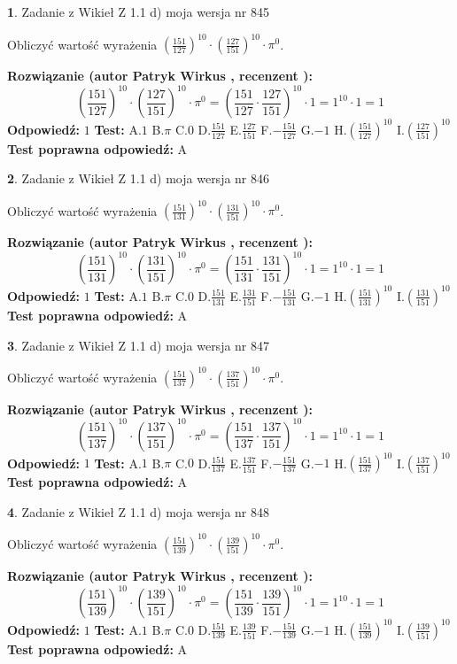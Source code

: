 \documentclass[12pt, a4paper]{article}
\theoremstyle{definition} %
\newtheorem{zad}{}
\newcommand{\zadStart}[1]{\begin{zad}#1\newline}
\newcommand{\zadStop}{\end{zad}}
\newcommand{\rozwStart}[2]{\noindent \textbf{Rozwiązanie (autor #1 , recenzent #2): }\newline}
\newcommand{\rozwStop}{\newline}
\newcommand{\odpStart}{\noindent \textbf{Odpowiedź:}\newline}
\newcommand{\odpStop}{\newline}
\newcommand{\testStart}{\noindent \textbf{Test:}\newline}
\newcommand{\testStop}{\newline}
\newcommand{\kluczStart}{\noindent \textbf{Test poprawna odpowiedź:}\newline}
\newcommand{\kluczStop}{\newline}
\begin{document}
\zadStart{Zadanie z Wikieł Z 1.1 d) moja wersja nr 845}

Obliczyć wartość wyrażenia $(\frac{151}{127})^{10} \cdot (\frac{127}{151})^{10} \cdot \pi^{0}$.
\zadStop
\rozwStart{Patryk Wirkus}{}
$$(\frac{151}{127})^{10} \cdot (\frac{127}{151})^{10} \cdot \pi^{0} = (\frac{151}{127} \cdot \frac{127}{151})^{10} \cdot 1 = 1^{10} \cdot 1 = 1$$
\rozwStop
\odpStart
$1$
\odpStop
\testStart
A.$1$ B.$\pi$ C.$0$ D.$\frac{151}{127}$ E.$\frac{127}{151}$
F.$-\frac{151}{127}$ G.$-1$
H.$(\frac{151}{127})^{10}$
I.$(\frac{127}{151})^{10}$
\testStop
\kluczStart
A
\kluczStop



\zadStart{Zadanie z Wikieł Z 1.1 d) moja wersja nr 846}

Obliczyć wartość wyrażenia $(\frac{151}{131})^{10} \cdot (\frac{131}{151})^{10} \cdot \pi^{0}$.
\zadStop
\rozwStart{Patryk Wirkus}{}
$$(\frac{151}{131})^{10} \cdot (\frac{131}{151})^{10} \cdot \pi^{0} = (\frac{151}{131} \cdot \frac{131}{151})^{10} \cdot 1 = 1^{10} \cdot 1 = 1$$
\rozwStop
\odpStart
$1$
\odpStop
\testStart
A.$1$ B.$\pi$ C.$0$ D.$\frac{151}{131}$ E.$\frac{131}{151}$
F.$-\frac{151}{131}$ G.$-1$
H.$(\frac{151}{131})^{10}$
I.$(\frac{131}{151})^{10}$
\testStop
\kluczStart
A
\kluczStop



\zadStart{Zadanie z Wikieł Z 1.1 d) moja wersja nr 847}

Obliczyć wartość wyrażenia $(\frac{151}{137})^{10} \cdot (\frac{137}{151})^{10} \cdot \pi^{0}$.
\zadStop
\rozwStart{Patryk Wirkus}{}
$$(\frac{151}{137})^{10} \cdot (\frac{137}{151})^{10} \cdot \pi^{0} = (\frac{151}{137} \cdot \frac{137}{151})^{10} \cdot 1 = 1^{10} \cdot 1 = 1$$
\rozwStop
\odpStart
$1$
\odpStop
\testStart
A.$1$ B.$\pi$ C.$0$ D.$\frac{151}{137}$ E.$\frac{137}{151}$
F.$-\frac{151}{137}$ G.$-1$
H.$(\frac{151}{137})^{10}$
I.$(\frac{137}{151})^{10}$
\testStop
\kluczStart
A
\kluczStop



\zadStart{Zadanie z Wikieł Z 1.1 d) moja wersja nr 848}

Obliczyć wartość wyrażenia $(\frac{151}{139})^{10} \cdot (\frac{139}{151})^{10} \cdot \pi^{0}$.
\zadStop
\rozwStart{Patryk Wirkus}{}
$$(\frac{151}{139})^{10} \cdot (\frac{139}{151})^{10} \cdot \pi^{0} = (\frac{151}{139} \cdot \frac{139}{151})^{10} \cdot 1 = 1^{10} \cdot 1 = 1$$
\rozwStop
\odpStart
$1$
\odpStop
\testStart
A.$1$ B.$\pi$ C.$0$ D.$\frac{151}{139}$ E.$\frac{139}{151}$
F.$-\frac{151}{139}$ G.$-1$
H.$(\frac{151}{139})^{10}$
I.$(\frac{139}{151})^{10}$
\testStop
\kluczStart
A
\kluczStop
\end{document}
